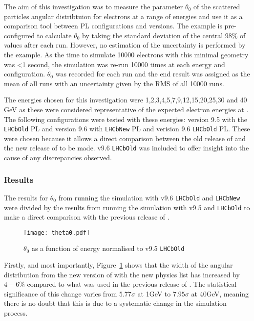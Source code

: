 The aim of this investigation was to measure the parameter $\theta_0$ of the scattered particles angular distribtuion for electrons at a range of energies and use it as a comparison tool between PL configurations and \geant versions.  The \geant example is pre-configured to calculate $\theta_0$ by taking the standard deviation of the central $98\%$ of values after each run.  However, no estimation of the uncertainty is performed by the example. As the time to simulate 10000 electrons with this minimal geometry was <1 second, the simulation was re-run 10000 times at each energy and configuration.  $\theta_0$ was recorded for each run and the end result was assigned as the mean of all runs with an uncertainty given by the RMS of all 10000 runs.

The energies chosen for this investigation were 1,2,3,4,5,7,9,12,15,20,25,30 and 40 GeV as these were considered representative of the expected electron energies at \lhcb. The following configurations were tested with these energies: \geant version 9.5 with the \texttt{LHCbOld} PL and version 9.6 with \texttt{LHCbNew} PL and verision 9.6 \texttt{LHCbOld} PL.  These were chosen because it allows a direct comparison between the old release of \geant and the new release of \geant to be made.  v9.6 \texttt{LHCbOld} was included to offer insight into the cause of any discrepancies observed.

\subsubsection{Results}
\label{sec:MscResults}
The results for $\theta_0$ from running the simulation with v9.6 \texttt{LHCbOld} and \texttt{LHCbNew} were divided by the results from running the simulation with v9.5 and \texttt{LHCbOld} to make a direct comparison with the previous release of \geant.
\begin{figure}[h]
  \centering
  \texttt{[image: theta0.pdf]}
  \caption{$\theta_0$ as a function of energy normalised to \geant v9.5 \texttt{LHCbOld}}
  \label{fig:theta0}
\end{figure}

Firstly, and most importantly, Figure~\ref{fig:theta0} shows that the width of the angular distribution from the new version of \geant with the new physics list has increased by $4-6\%$ compared to what was used in the previous release of \geant.  The statistical significance of this change varies from $5.77\sigma$ at 1GeV to $7.95\sigma$ at 40GeV, meaning there is no doubt that this is due to a systematic change in the simulation process.


